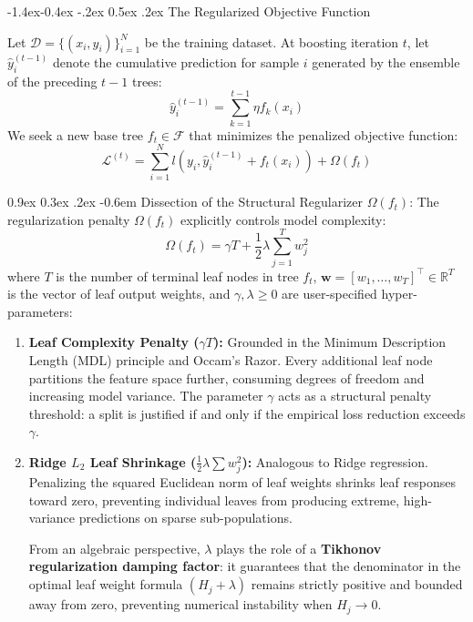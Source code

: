 \documentclass[11pt,a4paper]{article}
\makeatletter
\renewcommand\subsection{\@startsection{subsection}{2}{\z@}%
                                     {-1.4ex\@plus -0.4ex \@minus -.2ex}%
                                     {0.5ex \@plus .2ex}%
                                     {\normalfont\normalsize\bfseries}}
\renewcommand\paragraph{\@startsection{paragraph}{4}{\z@}%
                                     {0.9ex \@plus0.3ex \@minus.2ex}%
                                     {-0.6em}%
                                     {\normalfont\normalsize\bfseries}}
\newcommand{\R}{\mathbb{R}}
\makeatother
\begin{document}
\subsection{The Regularized Objective Function}

Let $\mathcal{D} = \{(x_i, y_i)\}_{i=1}^N$ be the training dataset. At boosting iteration $t$, let $\hat{y}_i^{(t-1)}$ denote the cumulative prediction for sample $i$ generated by the ensemble of the preceding $t-1$ trees:
\begin{equation}
    \hat{y}_i^{(t-1)} = \sum_{k=1}^{t-1} \eta f_k(x_i)
\end{equation}
We seek a new base tree $f_t \in \mathcal{F}$ that minimizes the penalized objective function:
\begin{equation}
    \mathcal{L}^{(t)} = \sum_{i=1}^N l\left(y_i, \hat{y}_i^{(t-1)} + f_t(x_i)\right) + \Omega(f_t)
\end{equation}

\paragraph{Dissection of the Structural Regularizer $\Omega(f_t)$:}
The regularization penalty $\Omega(f_t)$ explicitly controls model complexity:
\begin{equation}
    \Omega(f_t) = \gamma T + \frac{1}{2} \lambda \sum_{j=1}^T w_j^2
\end{equation}
where $T$ is the number of terminal leaf nodes in tree $f_t$, $\mathbf{w} = [w_1, \dots, w_T]^\top \in \R^T$ is the vector of leaf output weights, and $\gamma, \lambda \ge 0$ are user-specified hyper-parameters:
\begin{enumerate}
    \item \textbf{Leaf Complexity Penalty ($\gamma T$):} Grounded in the Minimum Description Length (MDL) principle and Occam's Razor. Every additional leaf node partitions the feature space further, consuming degrees of freedom and increasing model variance. The parameter $\gamma$ acts as a structural penalty threshold: a split is justified if and only if the empirical loss reduction exceeds $\gamma$.
    \item \textbf{Ridge $L_2$ Leaf Shrinkage ($\frac{1}{2}\lambda \sum w_j^2$):} Analogous to Ridge regression. Penalizing the squared Euclidean norm of leaf weights shrinks leaf responses toward zero, preventing individual leaves from producing extreme, high-variance predictions on sparse sub-populations. 
    
    From an algebraic perspective, $\lambda$ plays the role of a \textbf{Tikhonov regularization damping factor}: it guarantees that the denominator in the optimal leaf weight formula $(H_j + \lambda)$ remains strictly positive and bounded away from zero, preventing numerical instability when $H_j \to 0$.
\end{enumerate}
\end{document}
